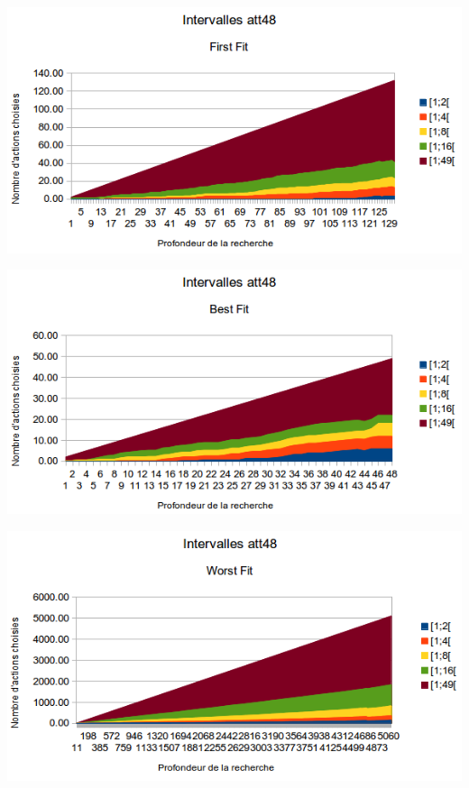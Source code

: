 \documentclass[a4paper,10pt]{report}
\begin{document}
\begin{center}
  \includegraphics[width=\textwidth]{images/att48-intervals-first-fit.png}
\end{center}

\begin{center}
  \includegraphics[width=\textwidth]{images/att48-intervals-best-fit.png}
\end{center}

\begin{center}
  \includegraphics[width=\textwidth]{images/att48-intervals-worst-fit.png}
\end{center}
\end{document}
